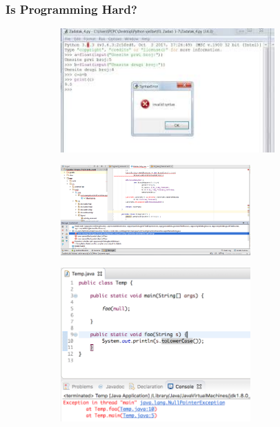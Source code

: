 \documentclass{beamer}
\begin{document}
\begin{frame}
  \frametitle{Is Programming Hard?}
  \begin{figure}[t]
    \begin{subfigure}[b]{0.3\textwidth}
      \includegraphics[width=0.9\textwidth]{images/syntax-error.jpeg}
    \end{subfigure}
    \pause
    \begin{subfigure}[b]{0.3\textwidth}
      \includegraphics[width=0.8\textwidth]{images/type-error.png}
    \end{subfigure}
    \pause
    \begin{subfigure}[b]{0.3\textwidth}
      \includegraphics[width=0.8\textwidth]{images/nullpointerexception.png}

\end{subfigure}
\end{figure}
\end{frame}
\end{document}
